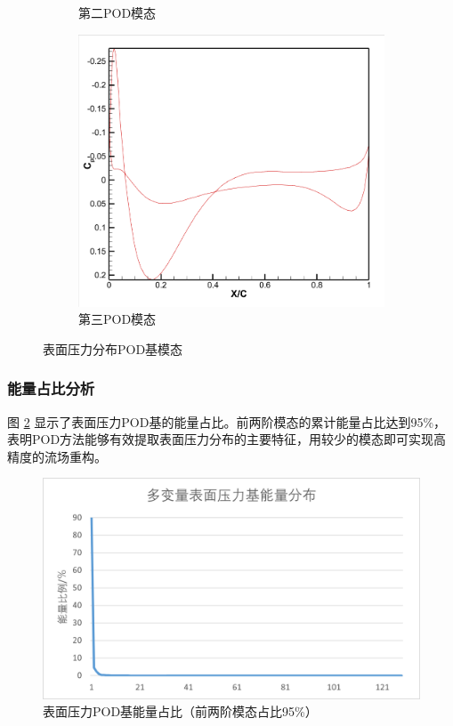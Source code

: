 \begin{figure}[H]
\begin{subfigure}[b]{0.32\textwidth}
        \caption{第二POD模态}
    \end{subfigure}
    \begin{subfigure}[b]{0.32\textwidth}
        \includegraphics[width=\textwidth]{image/基压力分布图/多变量表面压力基3.png}
        \caption{第三POD模态}
    \end{subfigure}
    \caption{\songti 表面压力分布POD基模态}
    \label{fig:kriging_surface_pod_modes}
\end{figure}

\subsubsection{能量占比分析}

图 \ref{fig:kriging_surface_energy} 显示了表面压力POD基的能量占比。前两阶模态的累计能量占比达到95\%，表明POD方法能够有效提取表面压力分布的主要特征，用较少的模态即可实现高精度的流场重构。

\begin{figure}[H]
    \centering
    \includegraphics[width=0.8\linewidth]{image/基能量分布/多变量表面压力基能量分布.png}
    \caption{\songti 表面压力POD基能量占比（前两阶模态占比95\%）}
    \label{fig:kriging_surface_energy}
\end{figure}

